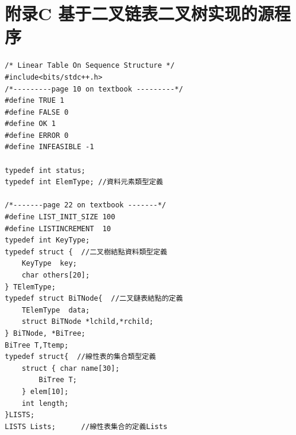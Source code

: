 \documentclass[supercite]{Experimental_Report}
\theoremstyle{definition}
\begin{document}
\section{附录C 基于二叉链表二叉树实现的源程序}
\begin{lstlisting}[style=commonCodeStyle, caption={目标程序}, label={lst:2-17}]
/* Linear Table On Sequence Structure */
#include<bits/stdc++.h>
/*---------page 10 on textbook ---------*/
#define TRUE 1
#define FALSE 0
#define OK 1
#define ERROR 0
#define INFEASIBLE -1 

typedef int status; 
typedef int ElemType; //資料元素類型定義

/*-------page 22 on textbook -------*/
#define LIST_INIT_SIZE 100
#define LISTINCREMENT  10
typedef int KeyType; 
typedef struct {  //二叉樹結點資料類型定義
	KeyType  key;
	char others[20];
} TElemType; 
typedef struct BiTNode{  //二叉鏈表結點的定義
	TElemType  data;
	struct BiTNode *lchild,*rchild;
} BiTNode, *BiTree;
BiTree T,Ttemp;
typedef struct{  //線性表的集合類型定義
	struct { char name[30];
		BiTree T; 
	} elem[10];
	int length;
}LISTS;
LISTS Lists;      //線性表集合的定義Lists


\end{lstlisting}
\end{document}
